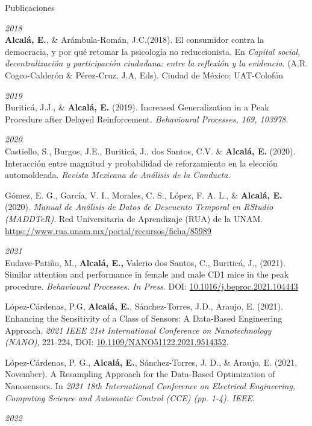 \documentclass{resume} %
\begin{document}
\begin{rSection}{Publicaciones}

	{\em 2018} \\
	{\bf Alcalá, E.}, \& Arámbula-Román, J.C.(2018). El consumidor contra la democracia, y por qué retomar la psicología no reduccionista. En \textit{Capital social, decentralización y participación ciudadana: entre la reflexión y la evidencia}. (A.R. Cogco-Calderón \& Pérez-Cruz, J.A, Eds). Ciudad de México: UAT-Colofón
	
	{\em 2019} \\
	Buriticá, J.J., \& \textbf{Alcalá, E.} (2019). Increased Generalization in a Peak Procedure after Delayed Reinforcement. \textit{Behavioural Processes, 169, 103978}.
	
	{\em 2020} \\
	Castiello, S., Burgos, J.E., Buriticá, J., dos Santos, C.V. \& \textbf{Alcalá, E.} (2020). Interacción entre magnitud y probabilidad de reforzamiento en la elección automoldeada. \textit{Revista Mexicana de Análisis de la Conducta.}
	
	Gómez, E. G., García, V. I., Morales, C. S., López, F. A. L., \& \textbf{Alcalá, E.} (2020). \textit{Manual de Análisis de Datos de Descuento Temporal en RStudio (MADDTeR)}. Red Universitaria de Aprendizaje (RUA) de la UNAM. \url{https://www.rua.unam.mx/portal/recursos/ficha/85989}
	
	{\em 2021} \\
	
	Eudave-Patiño, M., \textbf{Alcalá, E.,} Valerio dos Santos, C., Buriticá, J., (2021). Similar attention and performance in female and male CD1 mice in the peak procedure. \textit{Behavioural Processes. In Press}. DOI: \url{10.1016/j.beproc.2021.104443}
	
	López-Cárdenas, P.G, \textbf{Alcalá, E.}, Sánchez-Torres, J.D., Araujo, E. (2021). Enhancing the Sensitivity of a Class of Sensors: A Data-Based Engineering Approach. \textit{2021 IEEE 21st International Conference on Nanotechnology (NANO)}, 221-224, DOI: \url{10.1109/NANO51122.2021.9514352}. 
	
	López-Cárdenas, P. G.,\textbf{ Alcalá, E.}, Sánchez-Torres, J. D., \& Araujo, E. (2021, November). A Resampling Approach for the Data-Based Optimization of Nanosensors. In \textit{2021 18th International Conference on Electrical Engineering, Computing Science and Automatic Control (CCE) (pp. 1-4). IEEE.}
	
	{\em 2022}\\ 
	

\end{rSection}
\end{document}
